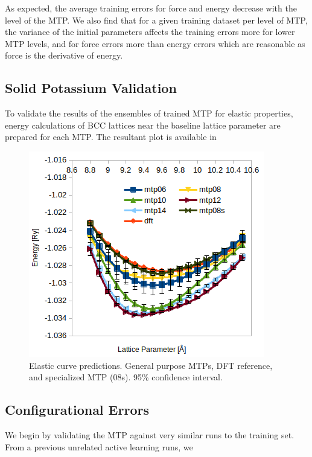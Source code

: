 \documentclass[9pt,twocolumn,twoside]{opticajnl}
\begin{document}
As expected, the average training errors for force and energy decrease with the level of the MTP. We also find that for a given training dataset per level of MTP, the variance of the initial parameters affects the training errors more for lower MTP levels, and for force errors more than energy errors which are reasonable as force is the derivative of energy. 

\subsection{Solid Potassium Validation}
To validate the results of the ensembles of trained MTP for elastic properties, energy calculations of BCC lattices near the baseline lattice parameter are prepared for each MTP. The resultant plot is available in 

\begin{figure}[ht]
  \centering
  \includegraphics[width=\linewidth]{assets/curve.png}
  \caption{Elastic curve predictions. General purpose MTPs, DFT reference, and specialized MTP (08s). 95\% confidence interval.}
  \label{fig:errors}
\end{figure}

\subsection{Configurational Errors}
We begin by validating the MTP against very similar runs to the training set. From a previous unrelated active learning runs, we 
\end{document}
